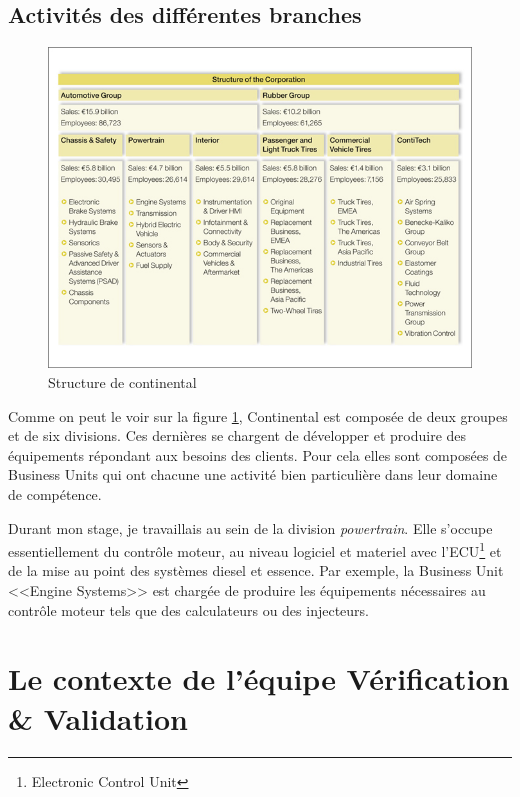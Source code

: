 		\subsection{Activités des différentes branches}
		\begin{figure}[H]
			\centering
			\includegraphics[width=18cm]{contents/images/structureConti.jpg}
			\caption{Structure de continental}
			\label{fig:structConti}
		\end{figure}

		Comme on peut le voir sur la figure \ref{fig:structConti}, Continental est composée de deux groupes et de six divisions. Ces dernières se chargent de développer et produire des équipements répondant aux besoins des clients. Pour cela elles sont composées de Business Units qui ont chacune une activité bien particulière dans leur domaine de compétence. 

Durant mon stage, je travaillais au sein de la division \textit{powertrain}. Elle s'occupe essentiellement du contrôle moteur, au niveau logiciel et materiel avec l'ECU\footnote{Electronic Control Unit} et de la mise au point des systèmes diesel et essence. Par exemple, la Business Unit <<Engine Systems>> est chargée de produire les équipements nécessaires au contrôle moteur tels que des calculateurs ou des 
injecteurs.

	\section{Le contexte de l'équipe Vérification \& Validation}
